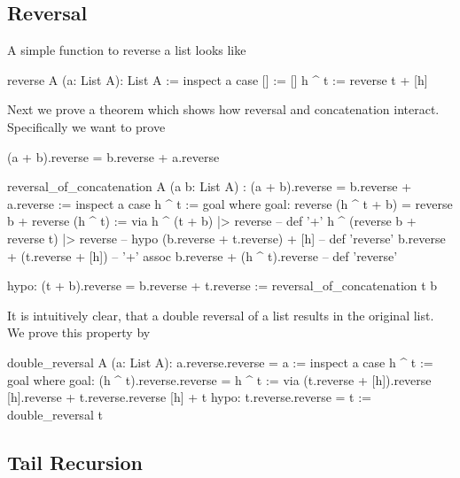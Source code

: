 \subsection{Reversal}



A simple function to reverse a list looks like

\begin{alba}
  reverse A (a: List A): List A :=
    inspect a case
      [] :=
        []
      h ^ t :=
        reverse t + [h]
\end{alba}


Next we prove a theorem which shows how reversal and concatenation
interact. Specifically we want to prove
\begin{alba}
  (a + b).reverse = b.reverse + a.reverse
\end{alba}

\begin{alba}
  reversal_of_concatenation
    A
    (a b: List A)
    : (a + b).reverse = b.reverse + a.reverse :=
      inspect a case
        h ^ t :=
          goal where
             goal: reverse (h ^ t + b) = reverse b + reverse (h ^ t) :=
               via
                 h ^ (t + b) |> reverse                     -- def '+'
                 h ^ (reverse b + reverse t) |> reverse     -- hypo
                 (b.reverse + t.reverse) + [h]              -- def 'reverse'
                 b.reverse + (t.reverse + [h])              -- '+' assoc
                 b.reverse + (h ^ t).reverse                -- def 'reverse'

             hypo: (t + b).reverse = b.reverse + t.reverse :=
               reversal_of_concatenation t b
\end{alba}


It is intuitively clear, that a double reversal of a list results in the
original list. We prove this property by
%
\begin{alba}
  double_reversal A (a: List A): a.reverse.reverse = a :=
    inspect a case
      h ^ t :=
        goal where
          goal: (h ^ t).reverse.reverse = h ^ t :=
            via
              (t.reverse + [h]).reverse
              [h].reverse + t.reverse.reverse
              [h] + t
          hypo: t.reverse.reverse = t :=
            double_reversal t
\end{alba}



\subsection{Tail Recursion}

